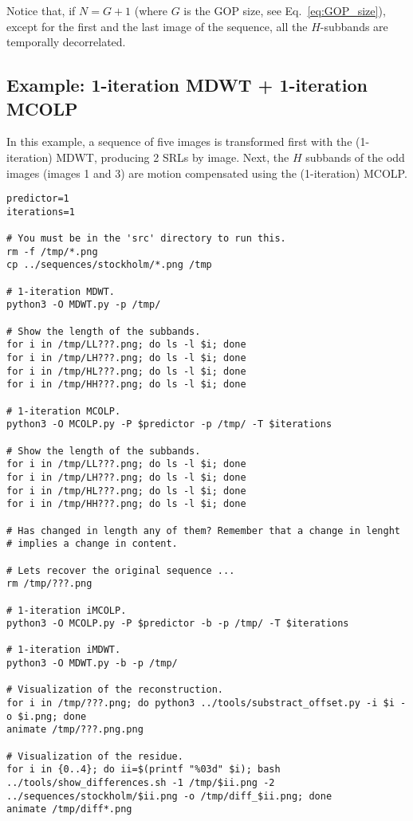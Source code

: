 Notice that, if $N=G+1$ (where $G$ is the GOP size, see
Eq.~\ref{eq:GOP_size}), except for the first and the last image of the
sequence, all the $H$-subbands are temporally decorrelated.

\subsection*{Example: 1-iteration MDWT + 1-iteration MCOLP}
In this example, a sequence of five images is transformed first with
the (1-iteration) MDWT, producing 2 SRLs by image. Next, the $H$
subbands of the odd images (images 1 and 3) are motion compensated
using the (1-iteration) MCOLP.

\begin{verbatim}
predictor=1
iterations=1

# You must be in the 'src' directory to run this.
rm -f /tmp/*.png
cp ../sequences/stockholm/*.png /tmp

# 1-iteration MDWT.
python3 -O MDWT.py -p /tmp/

# Show the length of the subbands.
for i in /tmp/LL???.png; do ls -l $i; done
for i in /tmp/LH???.png; do ls -l $i; done
for i in /tmp/HL???.png; do ls -l $i; done
for i in /tmp/HH???.png; do ls -l $i; done

# 1-iteration MCOLP.
python3 -O MCOLP.py -P $predictor -p /tmp/ -T $iterations

# Show the length of the subbands.
for i in /tmp/LL???.png; do ls -l $i; done
for i in /tmp/LH???.png; do ls -l $i; done
for i in /tmp/HL???.png; do ls -l $i; done
for i in /tmp/HH???.png; do ls -l $i; done

# Has changed in length any of them? Remember that a change in lenght
# implies a change in content.

# Lets recover the original sequence ...
rm /tmp/???.png

# 1-iteration iMCOLP.
python3 -O MCOLP.py -P $predictor -b -p /tmp/ -T $iterations

# 1-iteration iMDWT.
python3 -O MDWT.py -b -p /tmp/

# Visualization of the reconstruction.
for i in /tmp/???.png; do python3 ../tools/substract_offset.py -i $i -o $i.png; done
animate /tmp/???.png.png

# Visualization of the residue.
for i in {0..4}; do ii=$(printf "%03d" $i); bash ../tools/show_differences.sh -1 /tmp/$ii.png -2 ../sequences/stockholm/$ii.png -o /tmp/diff_$ii.png; done
animate /tmp/diff*.png
\end{verbatim}

